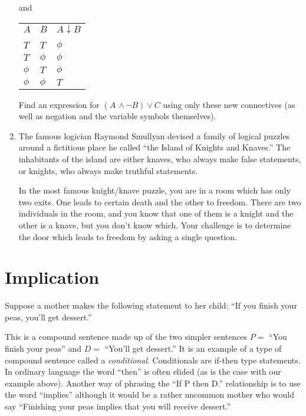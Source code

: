 \documentclass[10pt,]{book}
\theoremstyle{plain}
\theoremstyle{definition}
\theoremstyle{definition}
\numberwithin{equation}{section}
\newcommand{\hrulethin}  {\noalign{\hrule height 0.04em}}
\newcommand{\hint}[1]{ }
\begin{document}
\begin{enumerate}[label=(\alph*)]
          and
          \begin{tabular}{lll}
\(A\)&\(B\)&\(A \downarrow B\)\tabularnewline[0pt]
&&\tabularnewline\hrulethin
\(T\)&\(T\)&\(\phi\)\tabularnewline[0pt]
\(T\)&\(\phi\)&\(\phi\)\tabularnewline[0pt]
\(\phi\)&\(T\)&\(\phi\)\tabularnewline[0pt]
\(\phi\)&\(\phi\)&\(T\)
\end{tabular}

          Find an expression for \((A\, \land {\lnot}B) \lor C\)
          using only these new connectives (as well as negation and the
          variable symbols themselves).


          \hint{Sorry, I know this is probably the hardest problem in the chapter, but I'm (mostly) not going to help...
          Just one hint to help you get started: NAND and NOR are the negations of AND and OR (respectively) so, for example, \((X \land Y) \; \equiv \; {\lnot}(A \,\vert\, B)\).}
\item\hypertarget{IKK}{}
          The famous logician  Raymond Smullyan devised 
          a family of logical puzzles around a fictitious place he called 
           ``the Island of Knights and Knaves.''  The inhabitants of the island are either knaves, who always make false statements, or knights, who always make truthful statements.  

          In the most famous knight/knave puzzle, you are in a room which has only two exits.  One leads to certain death and the other to freedom.  There are two 
          individuals in the room, and you know that one of them is a knight and the other is a knave, but you don't know which.   Your challenge is to determine the door which leads to freedom by asking a single question.

          \hint{Ask one of them what the other one would say to do.}
\end{enumerate}
\typeout{************************************************}
\typeout{************************************************}
\section[{Implication}]{Implication}\label{sec_impl}

    Suppose a mother makes the following statement to her child:
    ``If you finish your peas, you'll get dessert.''
\par

    This is a compound sentence made up of the two simpler
    sentences \(P=\) ``You finish your peas'' and \(D=\) ``You'll get dessert.''
    It is an example of a type of compound sentence called a
    \emph{conditional}. Conditionals are if-then type statements.
    In ordinary language the word ``then'' is often elided (as is the case
    with our example above). Another way of phrasing the ``If P then D.''
    relationship is to use the word ``implies'' \textemdash{} although it would be
    a rather uncommon mother who would say ``Finishing your peas implies
    that you will receive dessert.''
\par
\end{document}
